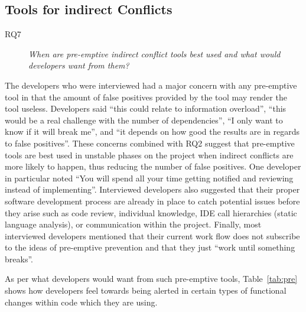 \documentclass[conference]{IEEEtran}
\begin{document}
\subsection{Tools for indirect Conflicts}

\begin{description}
	\item[RQ7] \textit{When are pre-emptive indirect conflict tools best used and what would developers want from them?}
\end{description}

The developers who were interviewed had a major concern with any pre-emptive tool in that the amount of false positives
provided by the tool may render the tool useless. Developers said ``this could relate to information overload'', ``this would
be a real challenge with the number of dependencies'', ``I only want to know if it will break me'', and ``it depends on how
good the results are in regards to false positives''. These concerns combined with RQ2 suggest that pre-emptive tools are
best used in unstable phases on the project when indirect conflicts are more likely to happen, thus reducing the number of false
positives. One developer in particular noted ``You will spend all your time getting notified and reviewing instead of implementing''.
Interviewed developers also suggested that their proper software development process are already in place to
catch potential issues before they arise such as code review, individual knowledge, IDE call hierarchies (static language analysis),
or communication within the project. Finally, most interviewed developers mentioned that their current work flow does
not subscribe to the ideas of pre-emptive prevention and that they just ``work until something breaks''. 

As per what developers would want from such pre-emptive tools, Table~\ref{tab:pre} shows how developers feel towards being 
alerted in certain types of functional changes within code which they are using.
\end{document}
